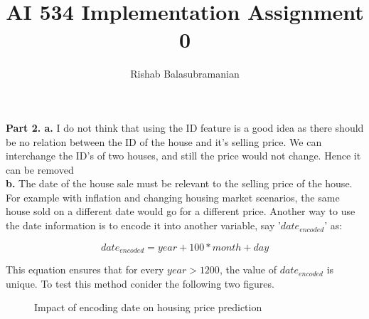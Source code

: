 \documentclass{article}
\title{AI 534 Implementation Assignment 0}
\author{Rishab Balasubramanian}
\date{}
\begin{document}
 
\maketitle

\textbf{Part 2. a.} I do not think that using the ID feature is a good idea as there should be no relation between the ID of the house and it's selling price. We can interchange the ID's of two houses, and still the price would not change. Hence it can be removed\\

\textbf{b.} The date of the house sale must be relevant to the selling price of the house. For example with inflation and changing housing market scenarios, the same house sold on a different date would go for a different price. Another way to use the date information is to encode it into another variable, say '$date_{encoded}$' as:

\begin{equation}
date_{encoded} = year + 100*month + day
\end{equation}

This equation ensures that for every $year>1200$, the value of $date_{encoded}$ is unique. To test this method conider the following two figures.

\begin{figure}[h]
    \centering
    \qquad
    \caption{Impact of encoding date on housing price prediction}%
    \label{fig:price}%
\end{figure}
\end{document}
